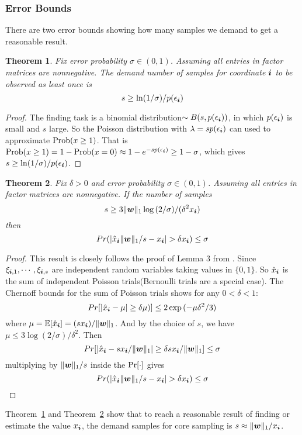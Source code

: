 \documentclass[letterpaper]{article}
\newcommand{\score}[1]{\xi_{\V{i},#1}}
\newcommand{\V}[1]{{\boldsymbol{{\MakeLowercase{#1}}}}}
\newcommand{\norm}[2]{\|#1\|_{#2}}
\newcommand{\Lem}[1]  {Lemma~\ref{lem:#1}}
\newcommand{\Theo}[1] {Theorem~\ref{theo:#1}}
\newcommand{\predx}{\hat{x}_{\V{i}}}
\newtheorem{theorem}{Theorem}
\begin{document}
\subsubsection{Error Bounds}
There are two error bounds showing how many samples we demand to get a reasonable result. 
\begin{theorem}\label{theo:ObservationBound}
Fix error probability $\sigma \in (0,1)$.
Assuming all entries in factor matrices are nonnegative.
The demand number of samples for coordinate $\V{i}$ to be observed as least once is
\[
    s \geq \ln(1/\sigma)/p(\epsilon_{\V{i}})
\]
\end{theorem}
\begin{proof}
The finding task is a binomial distribution$\sim B(s,p(\epsilon_{\V{i}}))$,
in which $p(\epsilon_{\V{i}})$ is small and $s$ large.
So the Poisson distribution with $\lambda = sp(\epsilon_{\V{i}})$
can used to approximate ${\rm Prob}(x\geq1)$.
That is ${\rm Prob}(x\geq1) = 1-{\rm Prob}(x=0)\approx 1-e^{-sp(\epsilon_{\V{i}})} \geq 1-\sigma$,
which gives $s \geq \ln(1/\sigma)/p(\epsilon_{\V{i}})$.
\end{proof}
\begin{theorem}\label{theo:Bound}
Fix $\delta > 0$ and error probability $\sigma \in (0,1)$.
Assuming all entries in factor matrices are nonnegative.
If the number of samples
\[
    s \geq 3\norm{\V{w}}{1}\log{(2/\sigma)}/(\delta^2 x_{\V{i}})
\]
then
\[
    Pr(|\predx\norm{\V{W}}{1}/s - x_{\V{i}}| > \delta x_{\V{i}}) \leq \sigma
\]
\end{theorem}

\begin{proof}
This result is closely follows the proof of Lemma 3 from \cite{BaPiKoSe15}.
Since  $ \score{1},\cdots,\score{s} $
are independent random variables taking values in $\{0,1\}$.
So $\predx$ is the sum of independent Poisson trials(Bernoulli trials are a special case).
The Chernoff bounds for the sum of Poisson trials shows for any $0 <\delta <1 $:
\[
    Pr[|\predx - \mu|\geq\delta\mu)] \leq 2\exp{(-\mu\delta^2/3)}
\]
where $\mu=\mathbb{E}[\predx]=(sx_{\V{i}})/\norm{\V{W}}{1}$.
And by the choice of $s$, we have
$\mu\leq 3\log{(2/\sigma)/\delta^2}$.
Then
\[
    Pr[|\predx-sx_{\V{i}}/\norm{\V{W}}{1}|\geq\delta sx_{\V{i}}/\norm{\V{W}}{1}] \leq \sigma
\]
multiplying by $\norm{\V{W}}{1}/s$ inside the ${\rm Pr}[\cdot]$ gives
\[
    Pr(|\predx\norm{\V{W}}{1}/s - x_{\V{i}}| > \delta x_{\V{i}}) \leq \sigma
\]
\end{proof}
\Theo{ObservationBound} and \Theo{Bound} show that
to reach a reasonable result of finding or estimate the value $x_{\V{i}}$,
the demand samples for core sampling is $s\approx \norm{\V{w}}{1}/x_{\V{i}}$.
\end{document}
